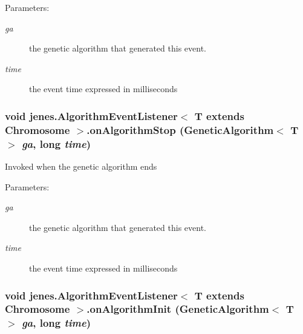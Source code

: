 \begin{Desc}
\item[Parameters:]
\begin{description}
\item[{\em ga}]the genetic algorithm that generated this event. \item[{\em time}]the event time expressed in milliseconds \end{description}
\end{Desc}
\hypertarget{interfacejenes_1_1_algorithm_event_listener_3_01_t_01extends_01_chromosome_01_4_b494ea60f6000ebcd02a94c7eda70dcf}{
\subsubsection[onAlgorithmStop]{\setlength{\rightskip}{0pt plus 5cm}void jenes.AlgorithmEventListener$<$ T extends Chromosome $>$.onAlgorithmStop (GeneticAlgorithm$<$ T $>$ {\em ga}, \/  long {\em time})}}
\label{interfacejenes_1_1_algorithm_event_listener_3_01_t_01extends_01_chromosome_01_4_b494ea60f6000ebcd02a94c7eda70dcf}


Invoked when the genetic algorithm ends

\begin{Desc}
\item[Parameters:]
\begin{description}
\item[{\em ga}]the genetic algorithm that generated this event. \item[{\em time}]the event time expressed in milliseconds \end{description}
\end{Desc}
\hypertarget{interfacejenes_1_1_algorithm_event_listener_3_01_t_01extends_01_chromosome_01_4_f5f6bb7f487c9ecd01331427a370889e}{
\subsubsection[onAlgorithmInit]{\setlength{\rightskip}{0pt plus 5cm}void jenes.AlgorithmEventListener$<$ T extends Chromosome $>$.onAlgorithmInit (GeneticAlgorithm$<$ T $>$ {\em ga}, \/  long {\em time})}}
\label{interfacejenes_1_1_algorithm_event_listener_3_01_t_01extends_01_chromosome_01_4_f5f6bb7f487c9ecd01331427a370889e}


